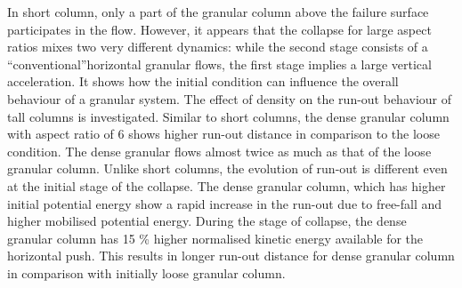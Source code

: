 In short column, only a part of the granular column above the failure surface 
participates in the flow. However, it appears that the collapse for 
large aspect ratios mixes two very different dynamics: while the second stage 
consists of a ``conventional''horizontal granular flows, the first stage 
implies a large vertical acceleration. It shows how the initial condition can 
influence the overall behaviour of a granular system. The effect of density on 
the run-out behaviour of tall columns is investigated. Similar to short 
columns, the dense granular column with aspect ratio of 6 shows higher run-out 
distance in comparison to the loose condition. The dense granular flows almost 
twice as much as that of the loose granular column. Unlike short columns, the 
evolution of run-out is different even at the initial stage of the collapse. 
The dense granular column, which has higher initial potential energy show a 
rapid increase in the run-out due to free-fall and higher mobilised potential 
energy. During the stage of collapse, the dense granular column has 15 \% 
higher normalised kinetic energy available for the horizontal push. This 
results in longer run-out distance for dense granular column in comparison with 
initially loose granular column.

